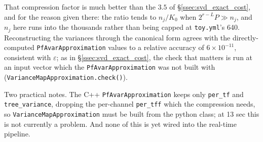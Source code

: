 \documentclass{article}
\numberwithin{equation}{section}   %
\begin{document}
That compression factor is much better than the $3.5$ of \S\ref{ssec:svd_exact_cost}, and for
the reason given there: the ratio tends to $n_j/K_0$ when $2^{r-L}P \gg n_j$, and $n_j$ here
runs into the thousands rather than being capped at {\tt toy.yml}'s 640. Reconstructing the
variances through the canonical form agrees with the directly-computed {\tt PfAvarApproximation}
values to a relative accuracy of $6 \times 10^{-11}$, consistent with $\varepsilon$; as in
\S\ref{ssec:svd_exact_cost}, the check that matters is run at an input vector which the
{\tt PfAvarApproximation} was not built with ({\tt VarianceMapApproximation.check()}).

Two practical notes. The C++ {\tt PfAvarApproximation} keeps only {\tt per\_tf} and
{\tt tree\_variance}, dropping the per-channel {\tt per\_tff} which the compression needs, so
{\tt VarianceMapApproximation} must be built from the python class; at 13 sec this is not
currently a problem. And none of this is yet wired into the real-time pipeline.
\end{document}
